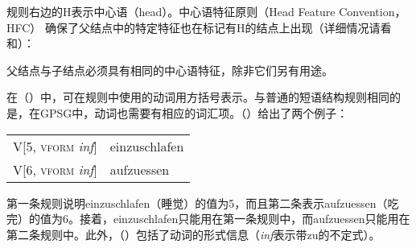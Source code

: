 规则右边的H表示中心语（head）。中心语特征原则（Head Feature Convention，HFC） 确保了父结点中的特定特征也在标记有H的结点上出现（详细情况请看\citealp*[\S~5.4]{GKPS85a}和\citealp[67]{Uszkoreit87a}）：
\begin{principle-break}
父结点与子结点必须具有相同的中心语特征，除非它们另有用途。
\end{principle-break}
%
在（）中，可在规则中使用的动词用方括号表示。与普通的短语结构规则相同的是，在GPSG中，动词也需要有相应的词汇项。（）给出了两个例子：
\ea
\begin{tabular}[t]{@{}l@{~$\to$~}l@{}}
V[5, \textsc{vform} \emph{inf}]  & einzuschlafen\\
V[6, \textsc{vform} \emph{inf}]  & aufzuessen\\
\end{tabular}
\z
第一条规则说明einzuschlafen（睡觉）的\subcatc 值为5，而且第二条表示aufzuessen（吃完）的\subcatc 值为6。接着，einzuschlafen只能用在第一条规则中，而aufzuessen只能用在第二条规则中。此外，（）包括了动词的形式信息（\emph{inf}表示带zu的不定式）。

